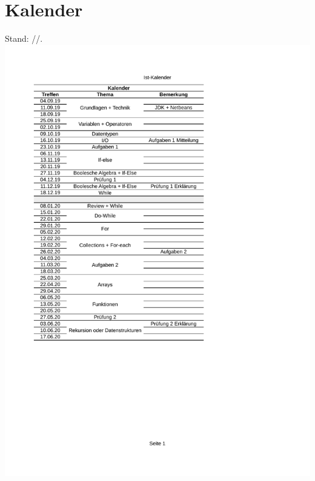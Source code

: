 \documentclass[a4paper]{article}
\begin{document}
	\section{Kalender}
	Stand: \the\day/\the\month/\the\year.\\
	\includegraphics[width=\textwidth]{Kalender}
\end{document}
